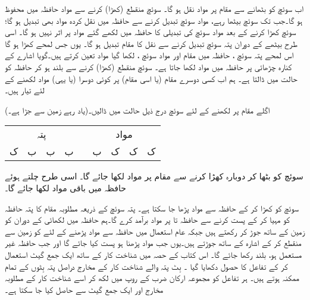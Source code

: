 اب  سوئچ کو بٹھانے سے   مقام  پر مواد  نقل ہو گا۔ سوئچ   منقطع (کھڑا) کرنے سے مواد حافظہ میں  محفوظ ہو گا۔جب تک  سوئچ  بیٹھا رہے، مواد  سوئچ تبدیل کرنے سے   حافظہ میں  نقل کردہ مواد  بھی تبدیل ہو گا؛ سوئچ کھڑا کرنے  کے بعد مواد سوئچ کی تبدیلی کا حافظہ میں لکھے گئے مواد پر  اثر نہیں ہو گا۔ اسی طرح بیٹھے  کے دوران پتہ سوئچ تبدیل کرنے سے   نقل کا مقام تبدیل ہو گا۔ یوں جس لمحے  کھڑا ہو گا اس لمحے پتہ سوئچ   ، حافظہ میں مقام  اور مواد سوئچ  ، لکھا گیا مواد تعین کرتے ہیں۔گویا   اشارے کے کنارہ چڑھائی پر  حافظہ میں مواد لکھا جاتا ہے۔ سوئچ  منقطع (کھڑا) کرنے   سے  بلند ہو کر حافظہ  کو     حالت میں ڈالتا ہے۔ ہم اب  کسی دوسرے مقام (یا اسی مقام) پر کوئی دوسرا (یا یہی) مواد لکھنے کے لئے تیار ہیں۔

اگلے مقام  پر   لکھنے کے لئے سوئچ درج ذیل حالت میں ڈالیں۔(یاد رہے  زمین سے جڑا ہے۔)
\begin{center}
\begin{tabular}{ccccccccc}
\multicolumn{4}{c}{پتہ}&\phantom{ک }&\multicolumn{4}{c}{مواد}\\[0.5ex]
ک&ب&ب&ب&&ب&ک&ک&ک
\end{tabular}
\end{center}
سوئچ  کو بٹھا کر  دوبارہ کھڑا کرنے سے مقام  پر مواد  لکھا جائے گا۔ اسی طرح  چلتے ہوئے حافظہ میں باقی مواد   لکھا جائے گا۔

سوئچ  کو کھڑا کر کے حافظہ سے مواد پڑھا جا سکتا ہے۔  پتہ سوئچ  کے ذریعہ  مطلوبہ مقام کا پتہ حافظہ کو مہیا کر کے      پست کرنے سے حافظہ    تا   پر  مواد  برآمد کرے گا۔ہم   حافظہ میں  لکھائی کے دوران  کو زمین کے ساتھ جوڑ کر رکھتے ہیں   جبکہ  عام استعمال میں  حافظہ سے مواد پڑھنے کے لئے    کو زمین سے منقطع کر کے اشارہ    کے ساتھ جوڑتے ہیں۔یوں  جب مواد پڑھنا ہو   پست کیا جائے گا اور جب حافظہ غیر مستعمل ہو،     بلند رکھا جائے گا۔
اس کتاب کے حصہ  میں شناخت کار کے ساتھ ایک جمع گیٹ استعمال کر کے تفاعل کا حصول دکھایا گیا ۔  بِٹ پتہ والے شناخت کار کے  مخارج دراصل پتہ بِٹوں کے تمام ممکنہ  ہوتے ہیں۔ ہر تفاعل کو مجموعہ ارکان ضرب کے روپ میں لکھ کر اسے شناخت کار کے مطلوبہ مخارج اور ایک جمع گیٹ سے حاصل کیا جا سکتا ہے۔ 

